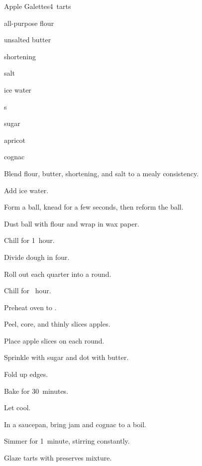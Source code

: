 \begin{recipe}{Apple Galettes}{}{4~tarts}

\begin{ingredients}
\item \C{1\quarter} all-purpose flour
\item {} unsalted butter
\item {} shortening
\item \tp{\quarter} salt
\item {} ice water
\item {}s
\item sugar
\item \C{\half} apricot 
\item {} cognac
\end{ingredients}

\begin{directions}
\item Blend flour, butter, shortening, and salt to a mealy consistency.
\item Add ice water.
\item Form a ball, knead for a few seconds, then reform the ball.
\item Dust ball with flour and wrap in wax paper.
\item Chill for 1~hour.
\item Divide dough in four.
\item Roll out each quarter into a  round.
\item Chill for \half~hour.
\item Preheat oven to .
\item Peel, core, and thinly slices apples.
\item Place apple slices on each round.
\item Sprinkle with sugar and dot with butter.
\item Fold up edges.
\item Bake for 30~minutes.
\item Let cool.
\item In a saucepan, bring jam and cognac to a boil.
\item Simmer for 1~minute, stirring constantly.
\item Glaze tarts with preserves mixture.
\end{directions}

\end{recipe}
